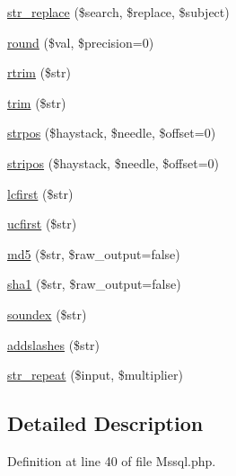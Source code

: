 \begin{DoxyCompactItemize}
\hyperlink{class_p_h_p_linq___adapter___pdo___mssql_acf873c5fe629bc33732a0a2bc304f0f8}{str\-\_\-replace} (\$search, \$replace, \$subject)
\item 
\hyperlink{class_p_h_p_linq___adapter___pdo___mssql_aa9d8fa8127391960c54ee0c5a31e18a3}{round} (\$val, \$precision=0)
\item 
\hyperlink{class_p_h_p_linq___adapter___pdo___mssql_afa81b944f8aed770a266a9884e3e5049}{rtrim} (\$str)
\item 
\hyperlink{class_p_h_p_linq___adapter___pdo___mssql_a432e7b973a6e6bfa55cced21e75ee29e}{trim} (\$str)
\item 
\hyperlink{class_p_h_p_linq___adapter___pdo___mssql_a75b50139ee3829fbfd47af6805284786}{strpos} (\$haystack, \$needle, \$offset=0)
\item 
\hyperlink{class_p_h_p_linq___adapter___pdo___mssql_aa0297b92e96759a576d3aa8caa22b10d}{stripos} (\$haystack, \$needle, \$offset=0)
\item 
\hyperlink{class_p_h_p_linq___adapter___pdo___mssql_a30bdc1fd395302cfaeabd165adde41c9}{lcfirst} (\$str)
\item 
\hyperlink{class_p_h_p_linq___adapter___pdo___mssql_a7d8809b3fca65a75b2bd2ebbea5b3695}{ucfirst} (\$str)
\item 
\hyperlink{class_p_h_p_linq___adapter___pdo___mssql_ad89ffd1039629dc781704c405abc87a7}{md5} (\$str, \$raw\-\_\-output=false)
\item 
\hyperlink{class_p_h_p_linq___adapter___pdo___mssql_aeb44f0e1038759e5c086db848661f845}{sha1} (\$str, \$raw\-\_\-output=false)
\item 
\hyperlink{class_p_h_p_linq___adapter___pdo___mssql_a5d9e5163f9c4dfcf3b36a635c8ba5638}{soundex} (\$str)
\item 
\hyperlink{class_p_h_p_linq___adapter___pdo___mssql_aec7fed6f81c650fb3106e2f0eed11e03}{addslashes} (\$str)
\item 
\hyperlink{class_p_h_p_linq___adapter___pdo___mssql_a046ec25a1370781be01e1590d84aecf7}{str\-\_\-repeat} (\$input, \$multiplier)
\end{DoxyCompactItemize}


\subsection{\-Detailed \-Description}


\-Definition at line 40 of file \-Mssql.\-php.



